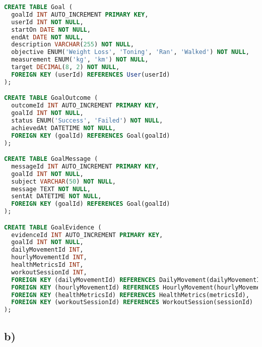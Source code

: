 \documentclass{article}
\begin{document}
\begin{lstlisting}[language=sql]
CREATE TABLE Goal (
  goalId INT AUTO_INCREMENT PRIMARY KEY,
  userId INT NOT NULL,
  startOn DATE NOT NULL,
  endAt DATE NOT NULL,
  description VARCHAR(255) NOT NULL,
  objective ENUM('Weight Loss', 'Toning', 'Ran', 'Walked') NOT NULL,
  measurement ENUM('kg', 'km') NOT NULL,
  target DECIMAL(8, 2) NOT NULL,
  FOREIGN KEY (userId) REFERENCES User(userId)
);

CREATE TABLE GoalOutcome (
  outcomeId INT AUTO_INCREMENT PRIMARY KEY,
  goalId INT NOT NULL,
  status ENUM('Success', 'Failed') NOT NULL,
  achievedAt DATETIME NOT NULL,
  FOREIGN KEY (goalId) REFERENCES Goal(goalId)
);

CREATE TABLE GoalMessage (
  messageId INT AUTO_INCREMENT PRIMARY KEY,
  goalId INT NOT NULL,
  subject VARCHAR(50) NOT NULL,
  message TEXT NOT NULL,
  sentAt DATETIME NOT NULL,
  FOREIGN KEY (goalId) REFERENCES Goal(goalId)
);

CREATE TABLE GoalEvidence (
  evidenceId INT AUTO_INCREMENT PRIMARY KEY,
  goalId INT NOT NULL,
  dailyMovementId INT,
  hourlyMovementId INT,
  healthMetricsId INT,
  workoutSessionId INT,
  FOREIGN KEY (dailyMovementId) REFERENCES DailyMovement(dailyMovementId),
  FOREIGN KEY (hourlyMovementId) REFERENCES HourlyMovement(hourlyMovementId),
  FOREIGN KEY (healthMetricsId) REFERENCES HealthMetrics(metricsId),
  FOREIGN KEY (workoutSessionId) REFERENCES WorkoutSession(sessionId)
);
\end{lstlisting}


\pagebreak
\subsection*{\small b)}
\end{document}
